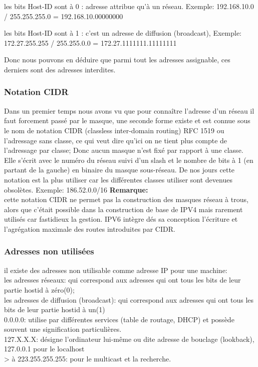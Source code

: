      les bits Host-ID sont à 0 : adresse attribue qu’à un réseau.
Exemple: 192.168.10.0 / 255.255.255.0 = 192.168.10.00000000

    les bits Host-ID sont à 1 : c’est un adresse de  diffusion (broadcast),
Exemple: 172.27.255.255 / 255.255.0.0 = 172.27.1111111.11111111

Donc nous pouvons en déduire que parmi tout les adresses assignable, ces
derniers sont des adresses interdites.

\subsubsection{Notation CIDR}
Dans un premier temps nous avons vu que pour connaître l’adresse d’un
réseau il faut forcement passé par le masque, une seconde forme existe et est
connue sous le nom de notation CIDR (classless inter-domain routing) RFC 1519
ou l’adressage sans classe, ce qui veut dire qu’ici on ne tient plus compte de
l’adressage par classe; Donc aucun masque n’est fixé par rapport à une classe.
Elle s’écrit avec le numéro du réseau suivi d’un slash et le nombre de bits à 1
(en partant de la gauche) en binaire du masque sous-réseau. De nos jours cette
notation est la plus utiliser car les différentes classes utiliser sont
devenues  obsolètes.
\vspace{1cm}
Exemple: 186.52.0.0/16
\vspace{1cm}
\textbf{Remarque:}\\
cette notation CIDR ne permet pas la construction des masques réseau à trous,
alors que c’était possible dans la construction de base de IPV4 mais rarement
utilisés car fastidieux la gestion.  IPV6 intègre dés sa conception l’écriture
et l’agrégation maximale des routes introduites par CIDR. 


\subsubsection{Adresses non utilisées}
il existe des adresses non utilisable comme adresse IP pour une machine:\\
les adresses réseaux: qui correspond aux adresses qui ont tous les bits de
leur partie hostid à zéro(0);\\
les adresses de diffusion (broadcast): qui correspond aux adresses qui ont
tous les bits de leur partie hostid à un(1)\\
0.0.0.0: utilise par différentes services (table de routage, DHCP) et possède
souvent une signification particulières. \\
127.X.X.X: désigne l’ordinateur lui-même ou dite adresse de bouclage
(lookback), 127.0.0.1 pour le localhost\\
> à 223.255.255.255: pour le multicast et la recherche.\\

